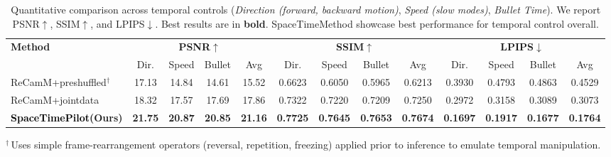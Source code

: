 \documentclass[10pt,twocolumn,letterpaper]{article}
\newcommand{\nameCOLOR}[1]{\textcolor{black}{#1}}
\newcommand{\nameMethod}{\nameCOLOR{\mbox{SpaceTimePilot}}\xspace}
\begin{document}



\begin{table}[t]
    \centering
    \caption{
        Quantitative comparison across temporal controls 
        (\textit{Direction (forward, backward motion)}, \textit{Speed (slow modes)}, \textit{Bullet Time}).
        We report PSNR$\uparrow$, SSIM$\uparrow$, and LPIPS$\downarrow$.
        Best results are in \textbf{bold}. SpaceTimeMethod showcase best performance for temporal control overall.
    }
    \vspace{-0.2cm}
    \label{tab:temporal_eval}
    \small
    \setlength\tabcolsep{3.6pt}  %
    \begin{tabular}{l|ccc|c|ccc|c|ccc|c}
        \toprule
        \multirow{2}{*}{\textbf{Method}} &
        \multicolumn{4}{c|}{\textbf{PSNR$\uparrow$}} &
        \multicolumn{4}{c|}{\textbf{SSIM$\uparrow$}} &
        \multicolumn{4}{c}{\textbf{LPIPS$\downarrow$}} \\
        \cmidrule(lr){2-5} \cmidrule(lr){6-9} \cmidrule(lr){10-13}
         & Dir. & Speed & Bullet & Avg
         & Dir. & Speed & Bullet & Avg
         & Dir. & Speed & Bullet & Avg \\
        \midrule

        ReCamM+preshuffled$^\dagger$
        & 17.13 & 14.84 & 14.61 & 15.52
        & 0.6623 & 0.6050 & 0.5965 & 0.6213
        & 0.3930 & 0.4793 & 0.4863 & 0.4529 \\

        ReCamM+jointdata
        & 18.32 & 17.57 & 17.69 & 17.86
        & 0.7322 & 0.7220 & 0.7209 & 0.7250
        & 0.2972 & 0.3158 & 0.3089 & 0.3073 \\

        \textbf{\nameMethod (Ours)}
        & \textbf{21.75} & \textbf{20.87} & \textbf{20.85} & \textbf{21.16}
        & \textbf{0.7725} & \textbf{0.7645} & \textbf{0.7653} & \textbf{0.7674}
        & \textbf{0.1697} & \textbf{0.1917} & \textbf{0.1677} & \textbf{0.1764} \\
        \bottomrule
    \end{tabular}

    {\footnotesize
    $^\dagger$\,Uses simple frame-rearrangement operators 
    (reversal, repetition, freezing) applied prior to inference to emulate 
    temporal manipulation.}
    \vspace{-0.3cm}
\end{table}
\end{document}
